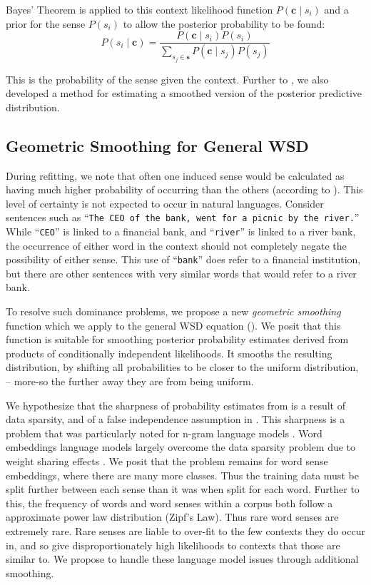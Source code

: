 \documentclass{article}
\def\parencite{\cite}
\renewcommand{\c}{\mathbf{c}}
\newcommand{\s}{\mathbf{s}}
\newcommand{\wordquote}[1]{\enquote{\texttt{#1}}}
\begin{document}
Bayes' Theorem is applied to this context likelihood function  $P(\c \mid s_{i})$ and a prior for the sense $P(s_i)$ to allow the posterior probability to be found:
\begin{equation} \label{eq:generalwsd}
P(s_{i} \mid \c) =
\dfrac{P(\c \mid s_{i})P(s_{i})}
{\sum_{s_{j}\in\s} P(\c \mid s_{j})P(s_{j})}
\end{equation}

This is the probability of the sense given the context.
Further to , we also developed a method for estimating a smoothed version of the posterior predictive distribution.


\subsection{Geometric Smoothing for General WSD} \label{smoothing}


During refitting, we note that often one induced sense would be calculated as having much higher probability of occurring than the others (according to ).
This level of certainty is not expected to occur in natural languages. 
Consider sentences such as \wordquote{The CEO of the bank, went for a picnic by the river.} 
While \wordquote{CEO} is linked to a financial bank, and \wordquote{river} is linked to a river bank, the occurrence of either word in the context should not completely negate the possibility of either sense.
This use of \wordquote{bank} does refer to a financial institution, but there are other sentences with very similar words that would refer to a river bank.

To resolve such dominance problems, we propose a new \emph{geometric smoothing} function which we apply to the general WSD equation ().
We posit that this function is suitable for smoothing posterior probability estimates derived from products of conditionally independent likelihoods.
It smooths the resulting distribution, by shifting all probabilities to be closer to the uniform distribution,  -- more-so the further away they are from being uniform.

We hypothesize that the sharpness of probability estimates from  is a result of data sparsity, and of a false independence assumption in . This sharpness is a problem that was particularly noted for n-gram language models \cite{rosenfeld2000two}.
Word  embeddings language models largely overcome the data sparsity problem due to weight sharing effects \parencite{NPLM}.
We posit that the problem remains for word sense embeddings, where there are many more classes.
Thus the training data must be split further between each sense than it was when split for each word. 
Further to this, the frequency of words \parencite{zipf1949human}  and word senses \parencite{Kilgarriff2004} within a corpus both follow a approximate power law distribution (Zipf's Law).
Thus rare word senses are extremely rare.
Rare senses are liable to over-fit to the few contexts they do occur in, and so give disproportionately high likelihoods to contexts that those are similar to.
We propose to handle these language model issues through additional smoothing.
\end{document}
